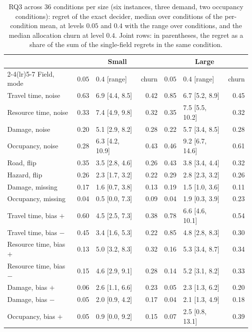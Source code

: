 \documentclass[systems,article,submit,moreauthors,pdftex]{Definitions/mdpi}
\begin{document}
\begin{table}[H]
\centering
\caption{RQ3 across $36$ conditions per size (six instances, three demand, two occupancy
conditions): regret of the exact decider, median over conditions of the per-condition mean, at
levels $0.05$ and $0.4$ with the range over conditions, and the median allocation churn at level
$0.4$. Joint rows: in parentheses, the regret as a share of the sum of the single-field regrets
in the same condition.\label{tab:rq3}}
\scriptsize
\setlength{\tabcolsep}{3pt}
\begin{tabular}{lrlrrlr}
\toprule
& \multicolumn{3}{c}{Small} & \multicolumn{3}{c}{Large}\\
\cmidrule(lr){2-4}\cmidrule(lr){5-7}
Field, mode & $0.05$ & $0.4$ [range] & churn & $0.05$ & $0.4$ [range] & churn\\
\midrule
Travel time, noise & 0.63 & 6.9 [4.4, 8.5] & 0.42 & 0.85 & 6.7 [5.2, 8.9] & 0.45\\
Resource time, noise & 0.33 & 7.4 [4.9, 9.8] & 0.32 & 0.35 & 7.5 [5.5, 10.2] & 0.32\\
Damage, noise & 0.20 & 5.1 [2.9, 8.2] & 0.28 & 0.22 & 5.7 [3.4, 8.5] & 0.28\\
Occupancy, noise & 0.28 & 6.3 [4.2, 10.9] & 0.43 & 0.46 & 9.2 [6.7, 14.6] & 0.61\\
Road, flip & 0.35 & 3.5 [2.8, 4.6] & 0.26 & 0.43 & 3.8 [3.4, 4.4] & 0.32\\
Hazard, flip & 0.26 & 2.3 [1.7, 3.2] & 0.22 & 0.29 & 2.8 [2.3, 3.2] & 0.26\\
Damage, missing & 0.17 & 1.6 [0.7, 3.8] & 0.13 & 0.19 & 1.5 [1.0, 3.6] & 0.11\\
Occupancy, missing & 0.04 & 0.5 [0.0, 7.3] & 0.09 & 0.04 & 1.9 [0.3, 3.9] & 0.23\\
\midrule
Travel time, bias $+$ & 0.60 & 4.5 [2.5, 7.3] & 0.38 & 0.78 & 6.6 [4.6, 10.1] & 0.54\\
Travel time, bias $-$ & 0.45 & 3.4 [1.6, 5.3] & 0.22 & 0.85 & 4.8 [2.8, 8.3] & 0.30\\
Resource time, bias $+$ & 0.13 & 5.0 [3.2, 8.3] & 0.32 & 0.16 & 5.3 [3.4, 8.7] & 0.34\\
Resource time, bias $-$ & 0.15 & 4.6 [2.9, 9.1] & 0.28 & 0.14 & 5.2 [3.1, 8.2] & 0.33\\
Damage, bias $+$ & 0.06 & 2.6 [1.1, 6.6] & 0.23 & 0.05 & 2.3 [1.3, 6.2] & 0.20\\
Damage, bias $-$ & 0.05 & 2.0 [0.9, 4.2] & 0.17 & 0.04 & 2.1 [1.3, 4.9] & 0.18\\
Occupancy, bias $+$ & 0.05 & 0.9 [0.0, 9.2] & 0.15 & 0.07 & 2.5 [0.8, 13.1] & 0.39\\

\end{tabular}
\end{table}
\end{document}
